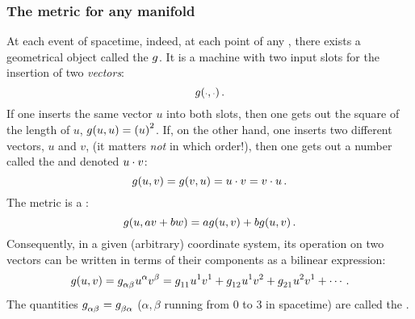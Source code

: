 \subsubsection{The metric for any manifold}
%
At each event of spacetime, indeed, at each point of any , there exists a geometrical object called the  $g$. It is a machine with two input slots for the insertion of two \emph{vectors}:
%
\begin{equation*}
  \metric\vat{\eslot, \eslot}\,.
\end{equation*}
%
If one inserts the same vector $u$ into both slots, then one gets out the square of the length of $u$, $\metric\vat{u,u} = \parens{u}^2$. If, on the other hand, one inserts two different vectors, $u$ and $v$, (it matters \emph{not} in which order!), then one gets out a number called the  and denoted $u\cdot v$:
%
\begin{equation*}
  \metric\vat{u,v} = \metric\vat{v,u}
                   = u\iprod v
                   = v\iprod u\,.
\end{equation*}
%
The metric is a :
%
\begin{equation*}
  \metric\vat{u, av + bw} = a\metric\vat{u, v} + b\metric\vat{u, v}\,.
\end{equation*}
%
Consequently, in a given (arbitrary) coordinate system, its operation on two vectors can be written in terms of their components as a bilinear expression:
%
\begin{equation*}
  \metric\vat{u,v} = \tcovmet\alpha\beta\tvec u\alpha\tvec v\beta
                   = \tcovmet 11\tvec u1\tvec v1 + \tcovmet 12\tvec u1\tvec v2 + \tcovmet 21\tvec u2\tvec v1 + \dotsb\,.
\end{equation*}
%
The quantities $\tcovmet\alpha\beta = \tcovmet\beta\alpha$ ($\alpha,\beta$ running from 0 to 3 in spacetime) are called the .


